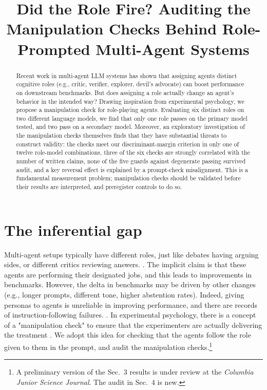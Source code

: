 \documentclass[11pt,a4paper]{article}
\title[Did the Role Fire?]{Did the Role Fire? Auditing the Manipulation Checks
Behind Role-Prompted Multi-Agent Systems}
\begin{document}
\maketitle

\begin{abstract}
Recent work in multi-agent LLM systems has shown that assigning agents distinct cognitive roles (e.g., critic, verifier, explorer, devil's advocate) can boost performance on downstream benchmarks. But does assigning a role actually change an agent's behavior in the intended way?  Drawing inspiration from experimental psychology, we propose a manipulation check for role-playing agents. Evaluating six distinct roles on two different language models, we find that only one role passes on the primary model tested, and two pass on a secondary model. Moreover, an exploratory investigation of the manipulation checks themselves finds that they have substantial threats to construct validity: the checks meet our discriminant-margin criterion in only one of twelve role-model combinations, three of the six checks are strongly correlated with the number of written claims, none of the five guards against degenerate passing survived audit, and a key reversal effect is explained by a prompt-check misalignment. This is a fundamental measurement problem; manipulation checks should be validated before their results are interpreted, and preregister controls to do so.
\end{abstract}

\section{The inferential gap}
Multi-agent setups typically have different roles, just like debates having arguing sides, or different critics reviewing answers. 
\citep{chan2024chateval,liang2024divergent,du2024debate}. The implicit claim is that these agents are performing their designated jobs, and this leads to improvements in benchmarks. However, the delta in benchmarks may be driven by other changes (e.g., longer prompts, different tone, higher abstention rates). Indeed, giving personas to agents is unreliable in improving performance, and there are records of instruction-following failures. \citep{zheng2023helpfulassistant, cemri2025mast}. In experimental psychology, there is a concept of a "manipulation check" to ensure that the experimenters are actually delivering the treatment \citep{hauser2018manipulation,ejelov2020manipulation}. We adopt this idea for checking that the agents follow the role given to them in the prompt, and audit the manipulation checks.\footnote{A
preliminary version of the Sec.~3 results is under review at the
\emph{Columbia Junior Science Journal}. The audit in Sec.~4 is new.}
\end{document}
